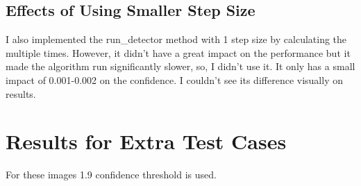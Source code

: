 \documentclass{article}
\begin{document}
\subsection{Effects of Using Smaller Step Size}
I also implemented the run\_detector method with 1 step size by calculating the multiple times. However, it didn't have a great impact on the performance but it made the algorithm run significantly slower, so, I didn't use it. It only has a small impact of 0.001-0.002 on the confidence. I couldn't see its difference visually on results.

\newpage

\section{Results for Extra Test Cases}
For these images 1.9 confidence threshold is used.
\end{document}
